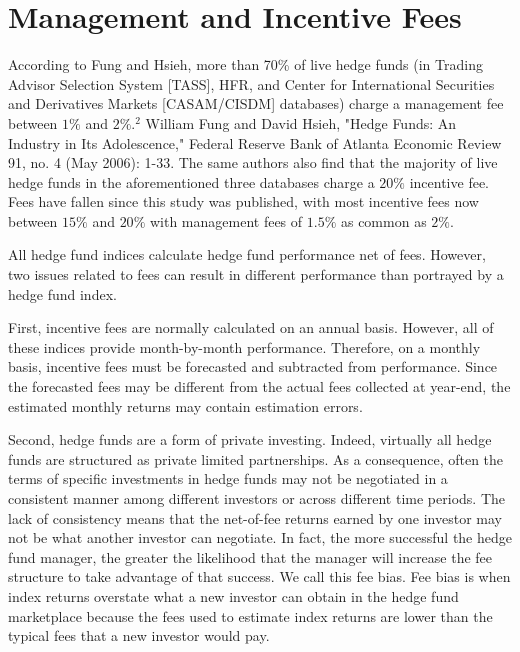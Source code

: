 \documentclass[11pt]{article}
\begin{document}
\section*{Management and Incentive Fees}
According to Fung and Hsieh, more than 70\% of live hedge funds (in Trading Advisor Selection System [TASS], HFR, and Center for International Securities and Derivatives Markets [CASAM/CISDM] databases) charge a management fee between $1 \%$ and $2 \% .{ }^{2}$ William Fung and David Hsieh, "Hedge Funds: An Industry in Its Adolescence," Federal Reserve Bank of Atlanta Economic Review 91, no. 4 (May 2006): 1-33. The same authors also find that the majority of live hedge funds in the aforementioned three databases charge a $20 \%$ incentive fee. Fees have fallen since this study was published, with most incentive fees now between $15 \%$ and $20 \%$ with management fees of $1.5 \%$ as common as $2 \%$.

All hedge fund indices calculate hedge fund performance net of fees. However, two issues related to fees can result in different performance than portrayed by a hedge fund index.

First, incentive fees are normally calculated on an annual basis. However, all of these indices provide month-by-month performance. Therefore, on a monthly basis, incentive fees must be forecasted and subtracted from performance. Since the forecasted fees may be different from the actual fees collected at year-end, the estimated monthly returns may contain estimation errors.

Second, hedge funds are a form of private investing. Indeed, virtually all hedge funds are structured as private limited partnerships. As a consequence, often the terms of specific investments in hedge funds may not be negotiated in a consistent manner among different investors or across different time periods. The lack of consistency means that the net-of-fee returns earned by one investor may not be what another investor can negotiate. In fact, the more successful the hedge fund manager, the greater the likelihood that the manager will increase the fee structure to take advantage of that success. We call this fee bias. Fee bias is when index returns overstate what a new investor can obtain in the hedge fund marketplace because the fees used to estimate index returns are lower than the typical fees that a new investor would pay.
\end{document}
